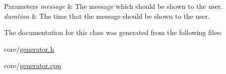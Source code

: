 \begin{DoxyParams}{Parameters}
{\em message} & The message which should be shown to the user. \\
\hline
{\em duration} & The time that the message should be shown to the user. \\
\hline
\end{DoxyParams}


The documentation for this class was generated from the following files\+:\begin{DoxyCompactItemize}
\item 
core/\hyperlink{generator_8h}{generator.\+h}\item 
core/\hyperlink{generator_8cpp}{generator.\+cpp}\end{DoxyCompactItemize}
